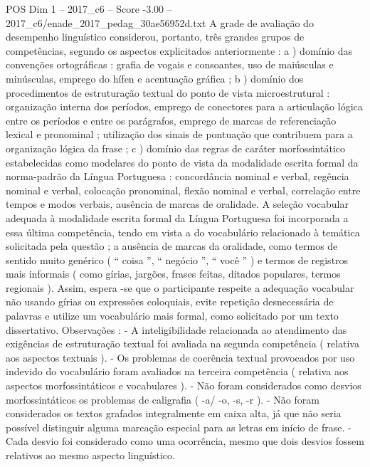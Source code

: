 \begin{textsample}{POS Dim 1 – 2017\_c6 – Score -3.00 – 2017\_c6/enade\_2017\_pedag\_30ae56952d.txt}
A grade de avaliação do desempenho linguístico considerou, portanto, três grandes grupos de competências, segundo os aspectos explicitados anteriormente : a ) domínio das convenções ortográficas : grafia de vogais e consoantes, uso de maiúsculas e minúsculas, emprego do hífen e acentuação gráfica ; b ) domínio dos procedimentos de estruturação textual do ponto de vista microestrutural : organização interna dos períodos, emprego de conectores para a articulação lógica entre os períodos e entre os parágrafos, emprego de marcas de referenciação lexical e pronominal ; utilização dos sinais de pontuação que contribuem para a organização lógica da frase ; c ) domínio das regras de caráter morfossintático estabelecidas como modelares do ponto de vista da modalidade escrita formal da norma-padrão da Língua Portuguesa : concordância nominal e verbal, regência nominal e verbal, colocação pronominal, flexão nominal e verbal, correlação entre tempos e modos verbais, ausência de marcas de oralidade.
A seleção vocabular adequada à modalidade escrita formal da Língua Portuguesa foi incorporada a essa última competência, tendo em vista a do vocabulário relacionado à temática solicitada pela questão ; a ausência de marcas da oralidade, como termos de sentido muito genérico ( “ coisa ”, “ negócio ”, “ você ” ) e termos de registros mais informais ( como gírias, jargões, frases feitas, ditados populares, termos regionais ).
Assim, espera -se que o participante respeite a adequação vocabular não usando gírias ou expressões coloquiais, evite repetição desnecessária de palavras e utilize um vocabulário mais formal, como solicitado por um texto dissertativo.
Observações : - A inteligibilidade relacionada ao atendimento das exigências de estruturação textual foi avaliada na segunda competência ( relativa aos aspectos textuais ). - Os problemas de coerência textual provocados por uso indevido do vocabulário foram avaliados na terceira competência ( relativa aos aspectos morfossintáticos e vocabulares ). - Não foram considerados como desvios morfossintáticos os problemas de caligrafia ( -a/ -o, -s, -r ). - Não foram considerados os textos grafados integralmente em caixa alta, já que não seria possível distinguir alguma marcação especial para as letras em início de frase. - Cada desvio foi considerado como uma ocorrência, mesmo que dois desvios fossem relativos ao mesmo aspecto linguístico.

\end{textsample}
